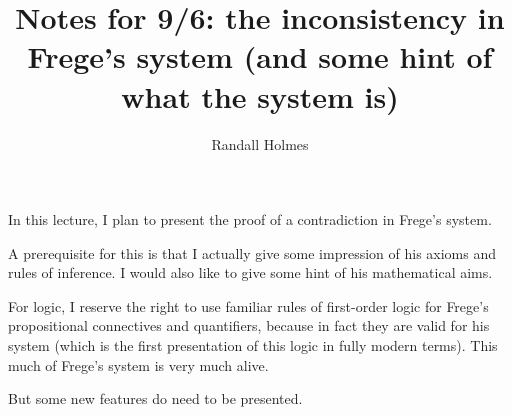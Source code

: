 \documentclass[12pt]{article}
\title{Notes for 9/6:  the inconsistency in Frege's system (and some hint of what the system is)}
\author{Randall Holmes}
\begin{document}
\maketitle

In this lecture, I plan to present the proof of a contradiction in Frege's system.

A prerequisite for this is that I actually give some impression of his axioms and rules of inference.  I would also like to give some hint of his mathematical aims.

For logic, I reserve the right to use familiar rules of first-order logic for Frege's propositional connectives and quantifiers, because in fact they are valid for his system (which is the first presentation of this logic in fully modern terms).  This much of Frege's system is very much alive.

But some new features do need to be presented.  
\end{document}
